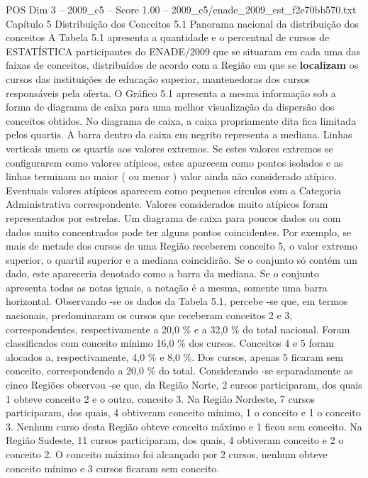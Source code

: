 \begin{textsample}{POS Dim 3 – 2009\_c5 – Score 1.00 – 2009\_c5/enade\_2009\_est\_f2e70bb570.txt}  \label{ex:f3_pos_139}
Capítulo 5 Distribuição dos Conceitos 5.1 Panorama nacional da distribuição dos conceitos A Tabela 5.1 apresenta a quantidade e o percentual de cursos de ESTATÍSTICA participantes do ENADE/2009 que se situaram em cada uma das faixas de conceitos, distribuídos de acordo com a Região em que se \textbf{localizam} os cursos das instituições de educação superior, mantenedoras dos cursos responsáveis pela oferta.
O Gráfico 5.1 apresenta a mesma informação sob a forma de diagrama de caixa para uma melhor visualização da dispersão dos conceitos obtidos.
No diagrama de caixa, a caixa propriamente dita fica limitada pelos quartis.
A barra dentro da caixa em negrito representa a mediana.
Linhas verticais unem os quartis aos valores extremos.
Se estes valores extremos se configurarem como valores atípicos, estes aparecem como pontos isolados e as linhas terminam no maior ( ou menor ) valor ainda não considerado atípico.
Eventuais valores atípicos aparecem como pequenos círculos com a Categoria Administrativa correspondente.
Valores considerados muito atípicos foram representados por estrelas.
Um diagrama de caixa para poucos dados ou com dados muito concentrados pode ter alguns pontos coincidentes.
Por exemplo, se mais de metade dos cursos de uma Região receberem conceito 5, o valor extremo superior, o quartil superior e a mediana coincidirão.
Se o conjunto só contém um dado, este apareceria denotado como a barra da mediana.
Se o conjunto apresenta todas as notas iguais, a notação é a mesma, somente uma barra horizontal.
Observando -se os dados da Tabela 5.1, percebe -se que, em termos nacionais, predominaram os cursos que receberam conceitos 2 e 3, correspondentes, respectivamente a 20,0 \% e a 32,0 \% do total nacional.
Foram classificados com conceito mínimo 16,0 \% dos cursos.
Conceitos 4 e 5 foram alocados a, respectivamente, 4,0 \% e 8,0 \%.
Dos cursos, apenas 5 ficaram sem conceito, correspondendo a 20,0 \% do total.
Considerando -se separadamente as cinco Regiões observou -se que, da Região Norte, 2 cursos participaram, dos quais 1 obteve conceito 2 e o outro, conceito 3.
Na Região Nordeste, 7 cursos participaram, dos quais, 4 obtiveram conceito mínimo, 1 o conceito e 1 o conceito 3.
Nenhum curso desta Região obteve conceito máximo e 1 ficou sem conceito.
Na Região Sudeste, 11 cursos participaram, dos quais, 4 obtiveram conceito e 2 o conceito 2.
O conceito máximo foi alcançado por 2 cursos, nenhum obteve conceito mínimo e 3 cursos ficaram sem conceito.

\end{textsample}
